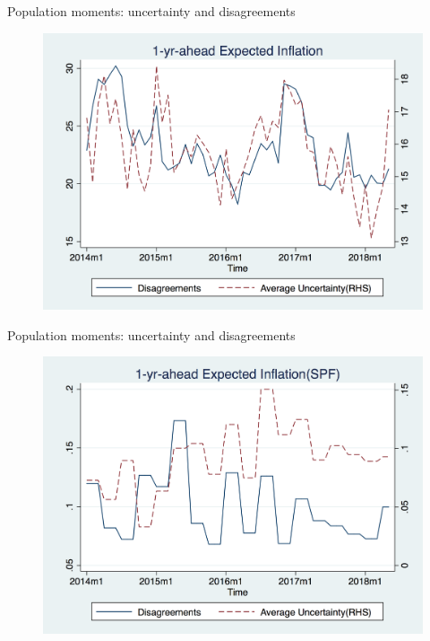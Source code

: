 \documentclass{beamer}
\begin{document}
\begin{frame}{Population moments: uncertainty and disagreements}
\begin{figure}
	\includegraphics[scale=0.3]{figures/var_disg.png} 
\end{figure}
\end{frame}


\begin{frame}{Population moments: uncertainty and disagreements}
\begin{figure}
	\includegraphics[scale=0.3]{figures/var_disg2.png} 
\end{figure}
\end{frame}
\end{document}
